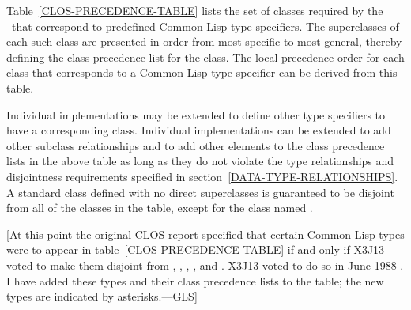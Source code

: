 Table~\ref{CLOS-PRECEDENCE-TABLE} lists the set of classes required by the \OS\
that correspond to predefined Common Lisp type specifiers.  The
superclasses of each such class are presented in order from most
specific to most general, thereby defining the class precedence list
for the class. The local precedence order for each class that
corresponds to a Common Lisp type specifier can be derived from this
table.

Individual implementations may be extended to define other type
specifiers to have a corresponding class.  Individual implementations
can be extended to add other subclass relationships and to add other
elements to the class precedence lists in the above table as long as
they do not violate the type relationships and disjointness
requirements specified in section~\ref{DATA-TYPE-RELATIONSHIPS}.
A standard class defined with no direct superclasses is guaranteed to
be disjoint from all of the classes in the table, except for the
class named \cd{t}.

[At this point the original CLOS report specified that certain Common Lisp
types were to appear in table~\ref{CLOS-PRECEDENCE-TABLE} if and only if
X3J13 voted to make them disjoint from
, , , , and .
X3J13 voted to do so in June 1988
.  I have added these types
and their class precedence lists to the table; the new types are indicated
by asterisks.---GLS]


